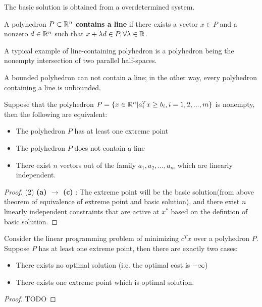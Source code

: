 \begin{refsection}
\begin{remark}
	The basic solution is obtained from a overdetermined system.
\end{remark}


\begin{definition}
	A polyhedron $P\subset \mathbb{R}^n$ \textbf{contains a line} if there exists a vector $x \in P$ and a nonzero $d\in \mathbb{R}^n$ such that $x+\lambda d \in P, \forall \lambda \in \mathbb{R}$. 
\end{definition}

\begin{example}
	A typical example of line-containing polyhedron is a polyhedron being the nonempty intersection of two parallel half-spaces.
\end{example}

\begin{lemma}
	A bounded polyhedron can not contain a line; in the other way, every polyhedron containing a line is unbounded.
\end{lemma}

\begin{theorem}
	Suppose that the polyhedron $P = \{x\in \mathbb{R}^n| a_i^T x \geq b_i, i=1,2,...,m\}$ is nonempty, then the following are equivalent:
	\begin{itemize}
		\item The polyhedron $P$ has at least one extreme point
		\item The polyhedron $P$ does not contain a line
		\item There exist $n$ vectors out of the family $a_1,a_2,...,a_m$ which are linearly independent.
	\end{itemize}
\end{theorem}
\begin{proof}
	(2) \textbf{(a) $\to $ (c) }: The extreme point will be the basic solution(from above theorem of equivalence of extreme point and basic solution), and there exist $n$ linearly independent constraints that are active at $x^*$ based on the defintion of basic solution.
\end{proof}


\begin{theorem}
	\cite[27]{bertsimas1997introduction}
	Consider the linear programming problem of minimizing $c^Tx$ over a polyhedron $P$. Suppose $P$ has at least one extreme point, then there are exactly two cases:
	\begin{itemize}
		\item There exists no optimal solution (i.e. the optimal cost is $-\infty$)
		\item There exists one extreme point which is optimal solution.
	\end{itemize}
\end{theorem}
\begin{proof}
	TODO
\end{proof}




\end{refsection}
